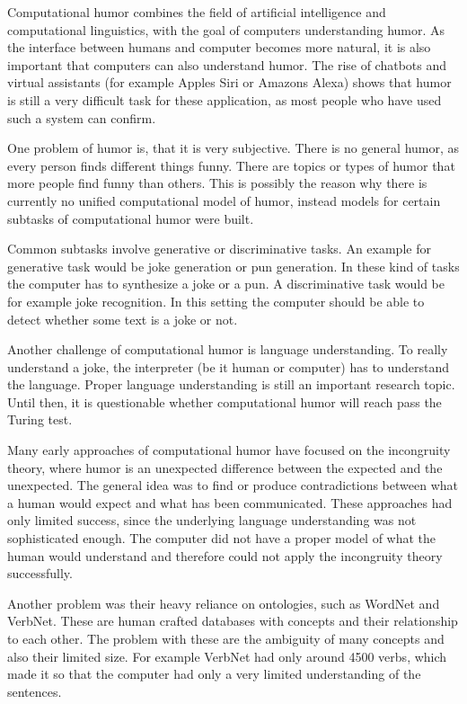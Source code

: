 \documentclass[draft,final,oneside]{vutinfth} %
\begin{document}
Computational humor combines the field of artificial intelligence and computational linguistics, with the goal of computers understanding humor. As the interface between humans and computer becomes more natural, it is also important that computers can also understand humor. The rise of chatbots and virtual assistants (for example Apples Siri or Amazons Alexa) shows that humor is still a very difficult task for these application, as most people who have used such a system can confirm.

One problem of humor is, that it is very subjective. There is no general humor, as every person finds different things funny. There are topics or types of humor that more people find funny than others. This is possibly the reason why there is currently no unified computational model of humor, instead models for certain subtasks of computational humor were built.

Common subtasks involve generative or discriminative tasks. An example for generative task would be joke generation or pun generation. In these kind of tasks the computer has to synthesize a joke or a pun. A discriminative task would be for example joke recognition. In this setting the computer should be able to detect whether some text is a joke or not.

Another challenge of computational humor is language understanding. To really understand a joke, the interpreter (be it human or computer) has to understand the language. Proper language understanding is still an important research topic. Until then, it is questionable whether computational humor will reach pass the Turing test.

Many early approaches of computational humor have focused on the incongruity theory, where humor is an unexpected difference between the expected and the unexpected. \cite{comphumorsummary} The general idea was to find or produce contradictions between what a human would expect and what has been communicated. These approaches had only limited success, since the underlying language understanding was not sophisticated enough. The computer did not have a proper model of what the human would understand and therefore could not apply the incongruity theory successfully.

Another problem was their heavy reliance on ontologies, such as WordNet and VerbNet. These are human crafted databases with concepts and their relationship to each other. The problem with these are the ambiguity of many concepts and also their limited size. For example VerbNet had only around 4500 verbs, which made it so that the computer had only a very limited understanding of the sentences. \cite{comphumorsummary}	
\end{document}
